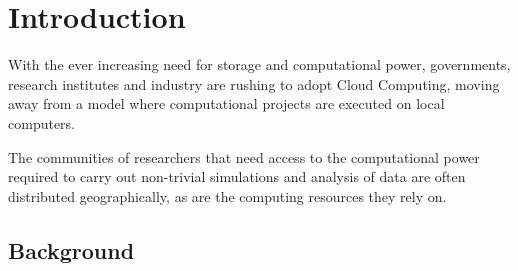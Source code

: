 \chapter{Introduction}
With the ever increasing need for storage and computational power,
governments, research institutes and industry are rushing to adopt
Cloud Computing, moving away from a model where computational projects
are executed on local computers.

The communities of researchers that need access to the computational
power required to carry out non-trivial simulations and analysis of
data are often distributed geographically, as are the computing
resources they rely on.


\section{Background}










